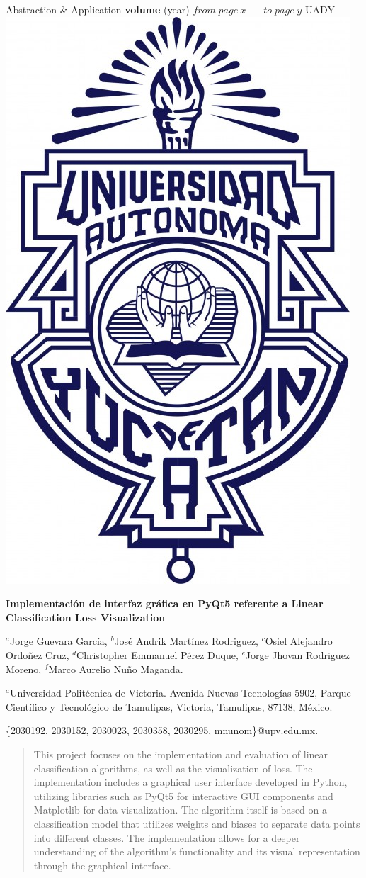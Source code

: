\documentclass[twoside,10pt]{article}
\numberwithin{equation}{section}
\begin{document}
\thispagestyle{plain} %

\begin{flushleft}
\small{Abstraction \& Application {\bf volume} (year) $from \; page
\: x \; - \; to \; page \;y$} \hfill UADY
\includegraphics[angle=0,width=0.06\linewidth]{UADY.jpg} %
\end{flushleft}

\bigskip

\begin{center}

{\bf{\Large Implementación de interfaz gráfica en PyQt5 referente a Linear Classification Loss Visualization}}

\vspace{0.2cm}

{\large {$^a$Jorge Guevara García, $^b$José Andrik Martínez Rodriguez, $^c$Osiel Alejandro Ordoñez Cruz, $^d$Christopher Emmanuel Pérez Duque, $^e$Jorge Jhovan Rodriguez Moreno, $^f$Marco Aurelio Nuño Maganda.} }

\vspace{0.2cm}

$^a$Universidad Politécnica de Victoria. Avenida Nuevas Tecnologías 5902, Parque Científico y Tecnológico de Tamulipas, Victoria, Tamulipas, 87138, México.

\medskip

\{2030192, 2030152, 2030023, 2030358, 2030295, mnunom\}@upv.edu.mx.

\end{center}


\renewcommand{\abstractname}{Abstract}
\begin{abstract}
This project focuses on the implementation and evaluation of linear classification algorithms, as well as the visualization of loss. The implementation includes a graphical user interface developed in Python, utilizing libraries such as PyQt5 for interactive GUI components and Matplotlib for data visualization. The algorithm itself is based on a classification model that utilizes weights and biases to separate data points into different classes. The implementation allows for a deeper understanding of the algorithm's functionality and its visual representation through the graphical interface.
\end{abstract}
\end{document}
